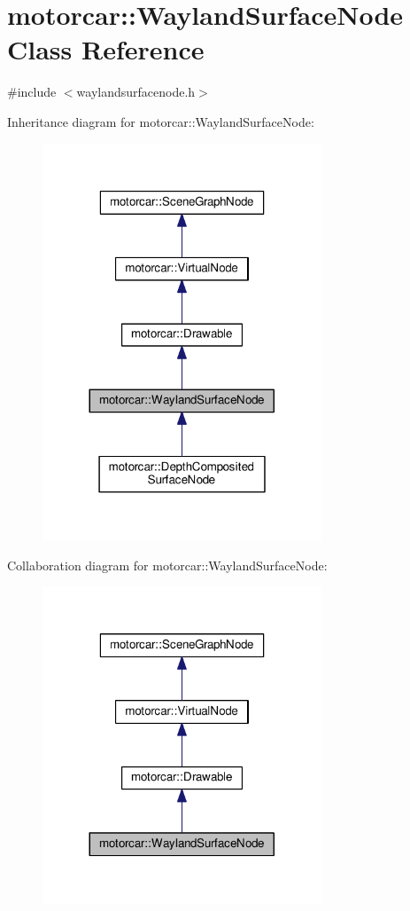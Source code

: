 \hypertarget{classmotorcar_1_1WaylandSurfaceNode}{\section{motorcar\-:\-:Wayland\-Surface\-Node Class Reference}
\label{classmotorcar_1_1WaylandSurfaceNode}
}


{\ttfamily \#include $<$waylandsurfacenode.\-h$>$}



Inheritance diagram for motorcar\-:\-:Wayland\-Surface\-Node\-:
\nopagebreak
\begin{figure}[H]
\begin{center}
\leavevmode
\includegraphics[width=236pt]{classmotorcar_1_1WaylandSurfaceNode__inherit__graph}
\end{center}
\end{figure}


Collaboration diagram for motorcar\-:\-:Wayland\-Surface\-Node\-:
\nopagebreak
\begin{figure}[H]
\begin{center}
\leavevmode
\includegraphics[width=236pt]{classmotorcar_1_1WaylandSurfaceNode__coll__graph}
\end{center}
\end{figure}
